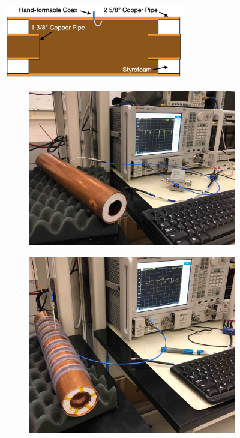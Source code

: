 \begin{figure}[htbp]
    \centering
    \includegraphics*[width=0.7\textwidth]{figs/Chapter-6/230612_toy_cavity_cartoon.png}
    \caption{}
\end{figure}


\begin{figure}[htbp]
    \centering
    \begin{subfigure}{0.48\textwidth}
        \includegraphics*[width=\textwidth]{figs/Chapter-6/230612_open_cav_meas_image.jpg}
        \caption{}        
    \end{subfigure}
    \hfill
    \begin{subfigure}{0.48\textwidth}
        \includegraphics*[width=\textwidth]{figs/Chapter-6/230612_filtered_cav_meas_image.jpg}

\end{subfigure}
\end{figure}
